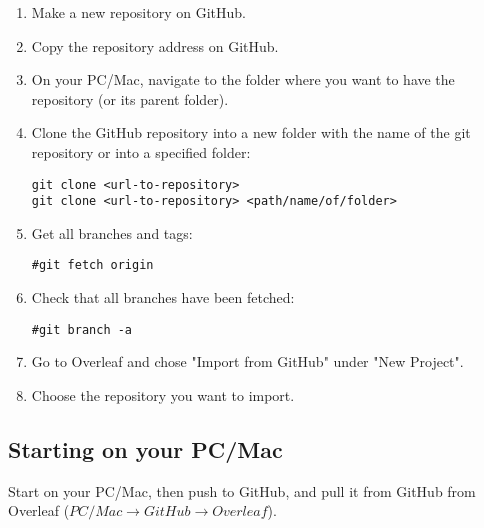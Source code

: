 \documentclass{report}
\begin{document}
\begin{enumerate}[noitemsep]
    \item Make a new repository on GitHub.
    \item Copy the repository address on GitHub.
    \item On your PC/Mac, navigate to the folder where you want to have the repository (or its parent folder).
    \item Clone the GitHub repository into a new folder with the name of the git repository or into a specified folder:
    \begin{verbatim}
git clone <url-to-repository>
git clone <url-to-repository> <path/name/of/folder>
    \end{verbatim}
    \item Get all branches and tags:
    \begin{verbatim}
#git fetch origin
    \end{verbatim}
    \item Check that all branches have been fetched:
    \begin{verbatim}
#git branch -a
    \end{verbatim}
    \item Go to Overleaf and chose "Import from GitHub" under "New Project".
    \item Choose the repository you want to import.
\end{enumerate}

\subsection{Starting on your PC/Mac}
Start on your PC/Mac, then push to GitHub, and pull it from GitHub from Overleaf
($PC/Mac \rightarrow GitHub \rightarrow Overleaf$).
\end{document}
